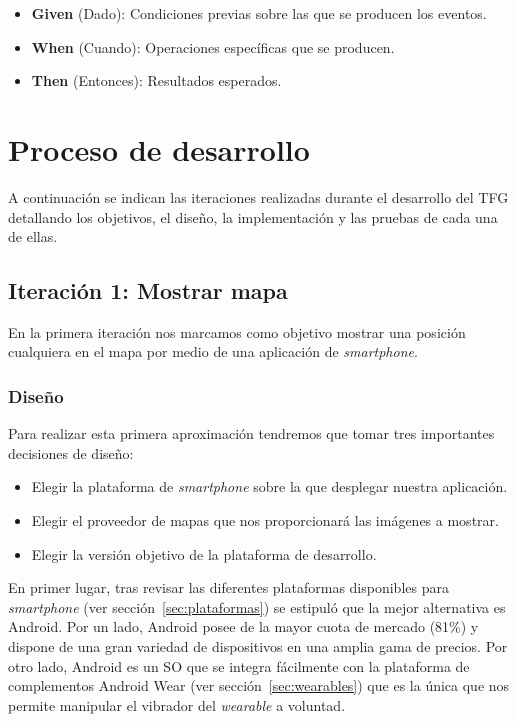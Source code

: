 \begin{itemize}
  \item \textbf{Given} (Dado): Condiciones previas sobre las que se producen los eventos.
  \item \textbf{When} (Cuando): Operaciones específicas que se producen.
  \item \textbf{Then} (Entonces): Resultados esperados.
\end{itemize}

\section{Proceso de desarrollo}

A continuación se indican las iteraciones realizadas durante el desarrollo del \acs{TFG} detallando
los objetivos, el diseño, la implementación y las pruebas de cada una de ellas.

\subsection{Iteración 1: Mostrar mapa}

En la primera iteración nos marcamos como objetivo mostrar una posición cualquiera en el mapa por
medio de una aplicación de \emph{smartphone}.

\subsubsection{Diseño}

Para realizar esta primera aproximación tendremos que tomar tres importantes decisiones de diseño:

\begin{itemize}
  \item Elegir la plataforma de \emph{smartphone} sobre la que desplegar nuestra aplicación.
  \item Elegir el proveedor de mapas que nos proporcionará las imágenes a mostrar.
  \item Elegir la versión objetivo de la plataforma de desarrollo.
\end{itemize}

En primer lugar, tras revisar las diferentes plataformas disponibles para \emph{smartphone} (ver
sección~\ref{sec:plataformas}) se estipuló que la mejor alternativa es Android. Por un lado, Android
posee de la mayor cuota de mercado (81\%) y dispone de una gran variedad de dispositivos en una
amplia gama de precios. Por otro lado, Android es un \acs{SO} que se integra fácilmente con la
plataforma de complementos Android Wear (ver sección~\ref{sec:wearables}) que es la única que nos
permite manipular el vibrador del \emph{wearable} a voluntad.

